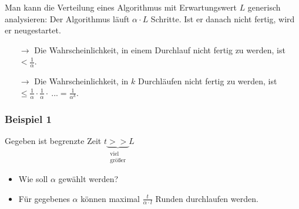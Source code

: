 \documentclass{scrartcl}%
\begin{document}
    \begin{figure}[htb]
        \centering

    \end{figure}

    Man kann die Verteilung eines Algorithmus mit Erwartungswert $L$ generisch analysieren: Der Algorithmus läuft $\alpha \cdot L$ Schritte.
    Ist er danach nicht fertig, wird er neugestartet.

    \begin{itemize}
        \item [$\rightarrow$] Die Wahrscheinlichkeit, in einem Durchlauf nicht fertig zu werden, ist $<\frac{1}{\alpha}$.
        \item [$\rightarrow$]   Die Wahrscheinlichkeit, in $k$ Durchläufen nicht fertig zu werden, ist $\leq \frac{1}{\alpha} \cdot \frac{1}{\alpha} \cdot\ ... = \frac{1}{\alpha^k}$.
    \end{itemize}

    \subsubsection*{Beispiel 1}
    Gegeben ist begrenzte Zeit $t \underbrace{>>}_{\substack{\text{viel} \\ \text{größer}}} L$
    \begin{itemize}
        \item Wie soll $\alpha$ gewählt werden?
        \item Für gegebenes $\alpha$ können maximal $\frac{t}{\alpha \cdot l}$ Runden durchlaufen werden.
    \end{itemize}
\end{document}
